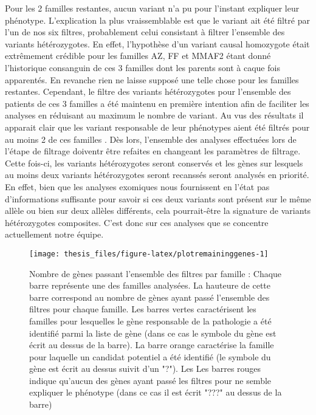 \documentclass[12pt,twoside]{reedthesis}
\theoremstyle{definition}
\theoremstyle{definition}
\theoremstyle{remark}
\begin{document}
  Pour les 2 familles restantes, aucun variant n'a pu pour l'instant
  expliquer leur phénotype. L'explication la plus vraissemblable est que
  le variant ait été filtré par l'un de nos six filtres, probablement
  celui consistant à filtrer l'ensemble des variants hétérozygotes. En
  effet, l'hypothèse d'un variant causal homozygote était extrêmement
  crédible pour les familles AZ, FF et MMAF2 étant donné l'historique
  consanguin de ces 3 familles dont les parents sont à caque fois
  apparentés. En revanche rien ne laisse supposé une telle chose pour les
  familles restantes. Cependant, le filtre des variants hétérozygotes pour
  l'ensemble des patients de ces 3 familles a été maintenu en première
  intention afin de faciliter les analyses en réduisant au maximum le
  nombre de variant. Au vus des résultats il apparait clair que les
  variant responsable de leur phénotypes aient été filtrés pour au moins 2
  de ces familles . Dès lors, l'ensemble des analyses effectuées lors de
  l'étape de filtrage doiventr être refaites en changeant les paramètres
  de filtrage. Cette fois-ci, les variants hétérozygotes seront conservés
  et les gènes sur lesquels au moins deux variants hétérozygotes seront
  recanssés seront analysés en priorité. En effet, bien que les analyses
  exomiques nous fournissent en l'état pas d'informations suffisante pour
  savoir si ces deux variants sont présent sur le même allèle ou bien sur
  deux allèles différents, cela pourrait-être la signature de variants
  hétérozygotes composites. C'est donc sur ces analyses que se concentre
  actuellement notre équipe.
  
  \begin{figure}
  
  {\centering \texttt{[image: thesis\_files/figure-latex/plotremaininggenes-1]} 
  
  }
  
  \caption[Nombre de gènes passant l'ensemble des filtres par famille]{Nombre de gènes passant l'ensemble des filtres par famille  :  Chaque barre représente une des familles analysées. La hauteure de cette barre correspond au nombre de gènes ayant passé l'ensemble des filtres pour chaque famille. Les barres vertes caractérisent les familles pour lesquelles le gène responsable de la pathologie a été identifié parmi la liste de gène (dans ce cas le symbole du gène est écrit au dessus de la barre). La barre orange caractérise la famille pour laquelle un candidat potentiel a été identifié (le symbole du gène est écrit au dessus suivit d'un "?"). Les Les barres rouges indique qu'aucun des gènes ayant passé les filtres pour ne semble expliquer le phénotype (dans ce cas il est écrit "???" au dessus de la barre)}\label{fig:plotremaininggenes}
  \end{figure}
  
\end{document}
